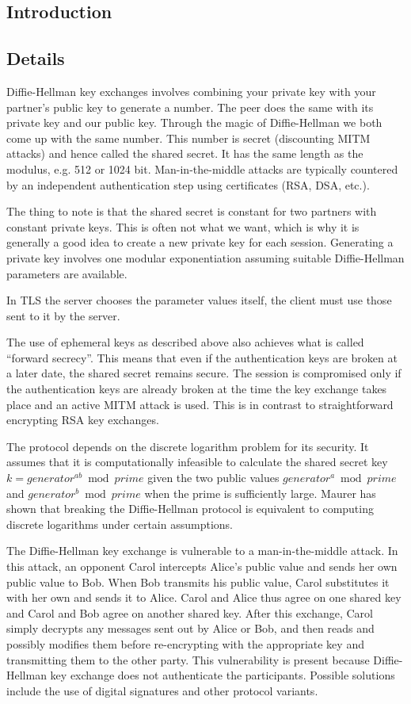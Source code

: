 \documentclass[a4paper,11pt]{article}
\begin{document}
\subsection{Introduction}

\subsection{Details}
Diffie-Hellman key exchanges involves combining your private key with your 
partner's public key to generate a number. The peer does the same with its 
private key and our public key. Through the magic of Diffie-Hellman we both come
up with the same number. This number is secret (discounting MITM attacks) and 
hence called the shared secret. It has the same length as the modulus, e.g. 512 
or 1024 bit. Man-in-the-middle attacks are typically countered by an independent
authentication step using certificates (RSA, DSA, etc.).

The thing to note is that the shared secret is constant for two partners with 
constant private keys. This is often not what we want, which is why it is 
generally a good idea to create a new private key for each session. Generating a
private key involves one modular exponentiation assuming suitable Diffie-Hellman
parameters are available.

In TLS the server chooses the parameter values itself, the client must use those
sent to it by the server.

The use of ephemeral keys as described above also achieves what is called 
``forward secrecy''. This means that even if the authentication keys are broken 
at a later date, the shared secret remains secure. The session is compromised 
only if the authentication keys are already broken at the time the key exchange 
takes place and an active MITM attack is used. This is in contrast to 
straightforward encrypting RSA key exchanges.

The protocol depends on the discrete logarithm problem for its security. It 
assumes that it is computationally infeasible to calculate the shared secret key
$k = generator^{ab} \bmod prime$ given the two public values 
$generator^{a} \bmod prime$ and $generator^{b} \bmod prime$ when the prime is 
sufficiently large. Maurer has shown that breaking the Diffie-Hellman protocol 
is equivalent to computing discrete logarithms under certain assumptions.

The Diffie-Hellman key exchange is vulnerable to a man-in-the-middle attack. In 
this attack, an opponent Carol intercepts Alice's public value and sends her own
public value to Bob. When Bob transmits his public value, Carol substitutes it 
with her own and sends it to Alice. Carol and Alice thus agree on one shared key
and Carol and Bob agree on another shared key. After this exchange, Carol simply
decrypts any messages sent out by Alice or Bob, and then reads and possibly 
modifies them before re-encrypting with the appropriate key and transmitting 
them to the other party. This vulnerability is present because Diffie-Hellman 
key exchange does not authenticate the participants. Possible solutions include 
the use of digital signatures and other protocol variants.
\end{document}
